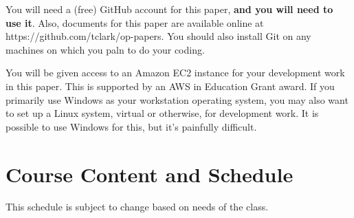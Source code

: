 \documentclass{article}
\begin{document}
You will need a (free) GitHub account for this paper, \textbf{and you will need to use it}.  Also, documents for this paper are available online at https://github.com/tclark/op-papers. You should also install Git on any machines on which you paln to do your coding.

You will be given access to an Amazon EC2 instance for your development work in this paper.  This is supported by an AWS in Education Grant award. If you primarily use Windows as your workstation operating system, you may also want to set up a Linux system, virtual or otherwise, for development work.  It is possible to use Windows for this, but it's painfully difficult.

\newpage

\section*{Course Content and Schedule}
This schedule is subject to change based on needs of the class.
\end{document}
